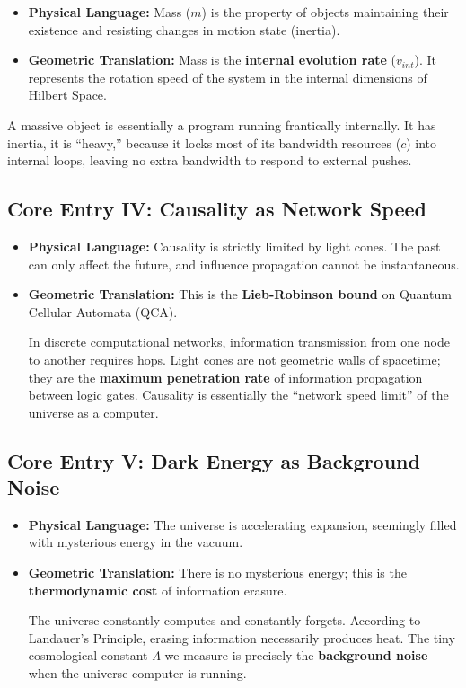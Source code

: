 \begin{itemize}
\item \textbf{Physical Language:} Mass ($m$) is the property of objects maintaining their existence and resisting changes in motion state (inertia).

\item \textbf{Geometric Translation:} Mass is the \textbf{internal evolution rate} ($v_{int}$). It represents the rotation speed of the system in the internal dimensions of Hilbert Space.
\end{itemize}

A massive object is essentially a program running frantically internally. It has inertia, it is ``heavy,'' because it locks most of its bandwidth resources ($c$) into internal loops, leaving no extra bandwidth to respond to external pushes.

\subsection{Core Entry IV: Causality as Network Speed}

\begin{itemize}
\item \textbf{Physical Language:} Causality is strictly limited by light cones. The past can only affect the future, and influence propagation cannot be instantaneous.

\item \textbf{Geometric Translation:} This is the \textbf{Lieb-Robinson bound} on Quantum Cellular Automata (QCA).

In discrete computational networks, information transmission from one node to another requires hops. Light cones are not geometric walls of spacetime; they are the \textbf{maximum penetration rate} of information propagation between logic gates. Causality is essentially the ``network speed limit'' of the universe as a computer.
\end{itemize}

\subsection{Core Entry V: Dark Energy as Background Noise}

\begin{itemize}
\item \textbf{Physical Language:} The universe is accelerating expansion, seemingly filled with mysterious energy in the vacuum.

\item \textbf{Geometric Translation:} There is no mysterious energy; this is the \textbf{thermodynamic cost} of information erasure.

The universe constantly computes and constantly forgets. According to Landauer's Principle, erasing information necessarily produces heat. The tiny cosmological constant $\Lambda$ we measure is precisely the \textbf{background noise} when the universe computer is running.
\end{itemize}

